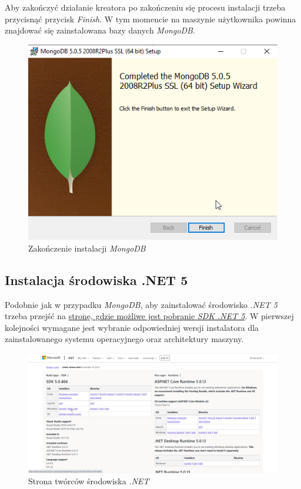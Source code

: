 \documentclass[a4paper,twoside,12pt]{book}
\begin{document}
{Aby zakończyć działanie kreatora po zakończeniu się procesu instalacji trzeba przycisnąć przycisk \textit{Finish}. W tym momencie na maszynie użytkownika powinna znajdować się zainstalowana bazy danych \textit{MongoDB}.
\begin{figure}[h!]
	\centering
	\includegraphics[width=0.65\linewidth]{../zrzuty_ekranu/instalcja_mongodb/mongodb_finish}
	\caption{Zakończenie instalacji \textit{MongoDB}}
	\label{fig:mongodbfinish}
\end{figure}
\FloatBarrier

\subsection{Instalacja środowiska .NET 5}
Podobnie jak w przypadku \textit{MongoDB}, aby zainstalować środowisko \textit{.NET 5} trzeba przejść na \href{https://dotnet.microsoft.com/en-us/download/dotnet/5.0}{stronę, gdzie możliwe jest pobranie \textit{SDK .NET 5}}. W pierwszej kolejności wymagane jest wybranie odpowiedniej wersji instalatora dla zainstalowanego systemu operacyjnego oraz architektury maszyny.
\begin{figure}[h!]
	\centering
	\includegraphics[width=1\linewidth]{../zrzuty_ekranu/instalacja_dotnet5/dotnet_sdk}
	\caption{Strona twórców środowiska \textit{.NET}}
	\label{fig:dotnetsdk}
\end{figure}
\FloatBarrier

}
\end{document}
